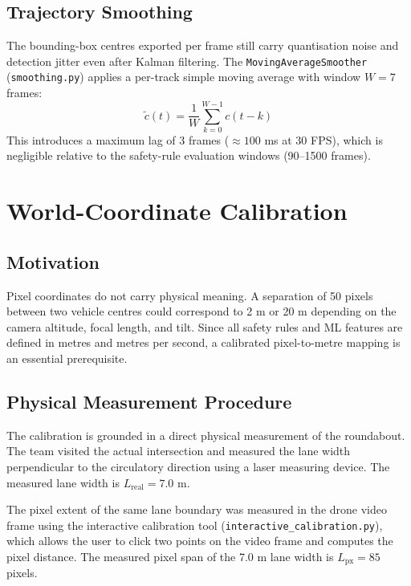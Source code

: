 \documentclass[12pt,a4paper]{report}
\begin{document}
\subsection{Trajectory Smoothing}

The bounding-box centres exported per frame still carry quantisation noise and
detection jitter even after Kalman filtering.  The \texttt{MovingAverageSmoother}
(\texttt{smoothing.py}) applies a per-track simple moving average with window $W = 7$
frames:
\begin{equation}
    \tilde{c}(t) = \frac{1}{W}\sum_{k=0}^{W-1} c(t-k)
    \label{eq:sma}
\end{equation}
This introduces a maximum lag of 3 frames ($\approx 100$ ms at 30 FPS), which is negligible
relative to the safety-rule evaluation windows (90--1500 frames).

\section{World-Coordinate Calibration}
\label{sec:calibration}

\subsection{Motivation}

Pixel coordinates do not carry physical meaning.  A separation of 50 pixels between two
vehicle centres could correspond to 2 m or 20 m depending on the camera altitude, focal
length, and tilt.  Since all safety rules and ML features are defined in metres and metres
per second, a calibrated pixel-to-metre mapping is an essential prerequisite.

\subsection{Physical Measurement Procedure}

The calibration is grounded in a direct physical measurement of the roundabout.  The team
visited the actual intersection and measured the lane width perpendicular to the
circulatory direction using a laser measuring device.  The measured lane width is
$L_{\text{real}} = 7.0$ m.

The pixel extent of the same lane boundary was measured in the drone video frame using the
interactive calibration tool (\texttt{interactive\_calibration.py}), which allows the user
to click two points on the video frame and computes the pixel distance.  The measured
pixel span of the 7.0 m lane width is $L_{\text{px}} = 85$ pixels.
\end{document}
